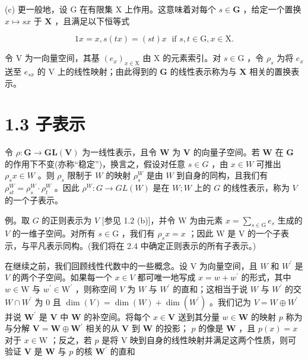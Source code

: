 \documentclass[10pt]{article}
\begin{document}
(c) 更一般地，设 G 在有限集 X 上作用。这意味着对每个 \(s \in  \mathbf{G}\) ，给定一个置换 \(x \mapsto  {sx}\) 于 \(\mathbf{X}\) ，且满足以下恒等式

\[
{1x} = x,s\left( {tx}\right)  = \left( {st}\right) x\;\text{ if }s,t \in  \mathrm{G},x \in  \mathrm{X}.
\]

令 \(\mathrm{V}\) 为一向量空间，其基 \({\left( {e}_{x}\right) }_{x \in  \mathrm{X}}\) 由 X 的元素索引。对 \(s \in  \mathrm{G}\) ，令 \({\rho }_{s}\) 为将 \({e}_{x}\) 送至 \({e}_{sx}\) 的 \(\mathrm{V}\) 上的线性映射；由此得到的 \(\mathbf{G}\) 的线性表示称为与 \(\mathbf{X}\) 相关的置换表示。

\section*{1.3 子表示}

令 \(\rho  : \mathbf{G} \rightarrow  \mathbf{{GL}}\left( \mathbf{V}\right)\) 为一线性表示，且令 \(\mathbf{W}\) 为 \(\mathbf{V}\) 的向量子空间。若 \(\mathbf{W}\) 在 \(\mathbf{G}\) 的作用下不变(亦称“稳定”)，换言之，假设对任意 \(s \in  G\) ，由 \(x \in  W\) 可推出 \({\rho }_{s}x \in  W\) 。则 \({\rho }_{s}\) 限制于 \(W\) 的映射 \({\rho }_{s}^{W}\) 是由 \(W\) 到自身的同构，且我们有 \({\rho }_{st}^{W} = {\rho }_{s}^{W} \cdot  {\rho }_{t}^{W}\) 。因此 \({\rho }^{W} : G \rightarrow  {GL}\left( W\right)\) 是在 \(W;W\) 上的 \(G\) 的线性表示，称为 \(V\) 的一个子表示。

例。取 \(G\) 的正则表示为 \(V\) [参见 1.2 (b)]，并令 W 为由元素 \(x = \mathop{\sum }\limits_{{s \in  \mathrm{G}}}{e}_{s}\) 生成的 \(V\) 的一维子空间。对所有 \(s \in  \mathrm{G}\) ，我们有 \({\rho }_{s}x = x\) ；因此 \(\mathrm{W}\) 是 \(\mathrm{V}\) 的一个子表示，与平凡表示同构。(我们将在 2.4 中确定正则表示的所有子表示。)

在继续之前，我们回顾线性代数中的一些概念。设 V 为向量空间，且 \(W\) 和 \({W}^{\prime }\) 是 \(V\) 的两个子空间。如果每一个 \(x \in  V\) 都可唯一地写成 \(x = w + {w}^{\prime }\) 的形式，其中 \(w \in  \mathrm{W}\) 与 \({w}^{\prime } \in  {\mathrm{W}}^{\prime }\) ，则称空间 \(V\) 为 \(W\) 与 \({W}^{\prime }\) 的直和；这相当于说 \(W\) 与 \({W}^{\prime }\) 的交 \(W \cap  {W}^{\prime }\) 为 0 且 \(\dim \left( V\right)  = \dim \left( W\right)  + \dim \left( {W}^{\prime }\right)\) 。我们记为 \(V = W \oplus  {W}^{\prime }\) 并说 \({\mathbf{W}}^{\prime }\) 是 \(\mathbf{V}\) 中 \(\mathbf{W}\) 的补空间。将每个 \(x \in  \mathbf{V}\) 送到其分量 \(w \in  \mathbf{W}\) 的映射 \(p\) 称为与分解 \(\mathbf{V} = \mathbf{W} \oplus  {\mathbf{W}}^{\prime }\) 相关的从 \(\mathbf{V}\) 到 \(\mathbf{W}\) 的投影； \(p\) 的像是 \(\mathbf{W}\) ，且 \(p\left( x\right)  = x\) 对于 \(x \in  \mathrm{W}\) ；反之，若 \(p\) 是将 \(\mathrm{V}\) 映到自身的线性映射并满足这两个性质，则可验证 \(\mathbf{V}\) 是 \(\mathbf{W}\) 与 \(p\) 的核 \({\mathbf{W}}^{\prime }\) 的直和
\end{document}
